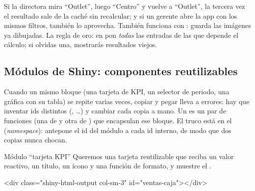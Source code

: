 Si la directora mira ``Outlet'', luego ``Centro'' y vuelve a ``Outlet'', la
tercera vez el resultado sale de la caché sin recalcular; y si un gerente
abre la app con los mismos filtros, también lo aprovecha. También funciona
con :  guarda las imágenes ya dibujadas. La regla de oro:
en  pon \emph{todas} las entradas de las que depende el
cálculo; si olvidas una, mostrarás resultados viejos.

\subsection{Módulos de Shiny: componentes reutilizables}

Cuando un mismo bloque (una tarjeta de KPI, un selector de periodo, una
gráfica con su tabla) se repite varias veces, copiar y pegar lleva a
errores: hay que inventar ids distintos (, \ldots)
y cambiar cada copia a mano. Un  es un par de
funciones (una de  y otra de ) que encapsulan ese
bloque. El truco está en el 
(\emph{namespace}):  antepone el id del módulo a cada id
interno, de modo que dos copias nunca chocan.

\begin{ejemplo}{Módulo ``tarjeta KPI''}
Queremos una tarjeta reutilizable que reciba un valor reactivo, un título,
un ícono y una función de formato, y muestre el .
\end{ejemplo}

\begin{rsalida}
<div class="shiny-html-output col-sm-3" id="ventas-caja"></div>
\end{rsalida}

